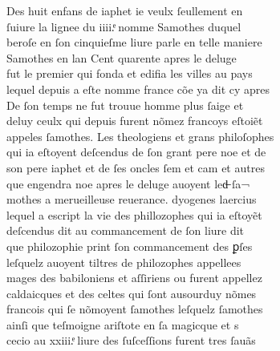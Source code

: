 \documentclass[12pt]{article}
\begin{document}
Des huit enfans de iaphet ie veulx ſeullement en\\
ſuiure la lignee du
          iiii.ͤ nomme Samothes duquel\\
beroſe en ſon cinquieſme liure
          parle en telle maniere\\
Samothes en lan Cent quarente apres le
                deluge\\
fut le premier qui fonda et edifia les villes au pays\\
lequel depuis a eſte nomme france cõe ya dit cy apres\\
De ſon temps ne fut
              trouue homme plus ſaige et\\
deluy ceulx qui depuis furent nõmez francoys
                eſtoiẽt\\
appeles ſamothes. Les theologiens et grans philoſophes\\
qui ia eſtoyent deſcendus de ſon grant pere noe et de\\
son pere iaphet et
          de ſes oncles ſem et cam
          et autres\\
que engendra noe apres le deluge
          auoyent led̶ ſa¬\\
mothes a merueilleuse
          reuerance. dyogenes laercius\\
lequel a escript la vie des
            phillozophes qui ia eſtoyẽt\\
deſcendus dit au commancement de ſon liure
            dit\\
que philozophie print ſon commancement des ꝑſes\\
leſquelz
          auoyent tiltres de philozophes appellees\\
mages des babiloniens et aſſiriens ou
          furent appellez\\
caldaicques et des celtes qui ſont ausourduy nõmes\\
francois qui ſe nõmoyent ſamothes leſquelz ſamothes\\
ainſi que teſmoigne
            ariſtote en ſa magicque et s\\
cecio au xxiii.ͤ liure des
            ſuſceſſions furent tres ſauãs



\newpage
\end{document}
